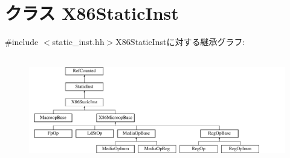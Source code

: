 \hypertarget{classX86ISA_1_1X86StaticInst}{
\section{クラス X86StaticInst}
\label{classX86ISA_1_1X86StaticInst}
}


{\ttfamily \#include $<$static\_\-inst.hh$>$}X86StaticInstに対する継承グラフ:\begin{figure}[H]
\begin{center}
\leavevmode
\includegraphics[height=4.74576cm]{classX86ISA_1_1X86StaticInst}
\end{center}
\end{figure}
